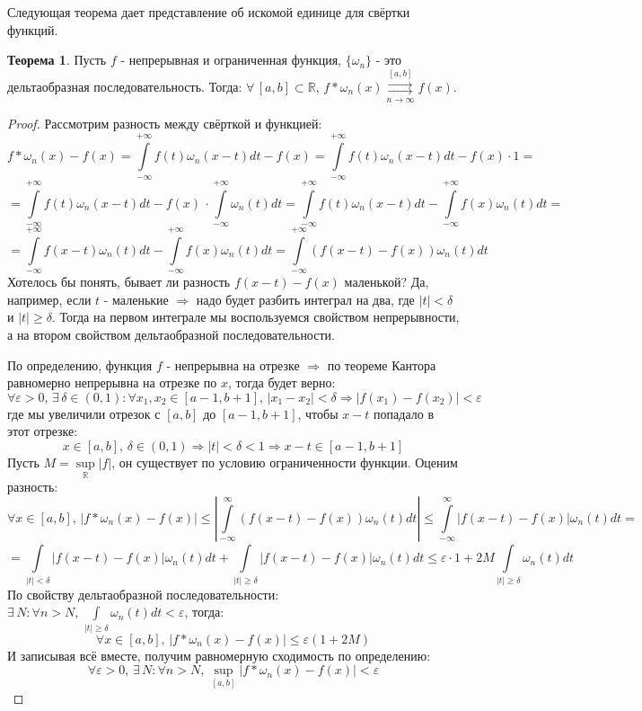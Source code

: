 \documentclass[12pt]{article}
\newcommand{\MR}{\mathbb{R}}
\newcommand{\VE}{\varepsilon}
\theoremstyle{definition}
\newtheorem{theorem}{Теорема}
\newcommand{\ddint}[2]{\displaystyle\int\limits_{#1}^{#2}}
\newcommand{\uconvm}[2]{\overset{#1}{\underset{#2}{\rightrightarrows}}}
\begin{document}
Следующая теорема дает представление об искомой единице для свёртки функций.
\begin{theorem}
	Пусть $f$ - непрерывная и ограниченная функция, $\{\omega_n\}$ - это дельтаобразная последовательность. Тогда: $\forall\, [a,b]\subset \MR, \, f *\omega_n(x) \uconvm{[a,b]}{n \to \infty}f(x)$.
\end{theorem} 
\begin{proof}
	Рассмотрим разность между свёрткой и функцией:
	$$
		f*\omega_n(x) - f(x) = \ddint{-\infty}{+\infty}f(t)\omega_n(x-t)dt - f(x) = \ddint{-\infty}{+\infty}f(t)\omega_n(x-t)dt - f(x){\cdot}1 =
	$$
	$$
		= \ddint{-\infty}{+\infty}f(t)\omega_n(x-t)dt - f(x)\,{\cdot}\!\!\ddint{-\infty}{+\infty}\omega_n(t)dt = \ddint{-\infty}{+\infty}f(t)\omega_n(x-t)dt - \ddint{-\infty}{+\infty}f(x)\omega_n(t)dt = 
	$$
	$$
		= \ddint{-\infty}{+\infty}f(x - t)\omega_n(t)dt - \ddint{-\infty}{+\infty}f(x)\omega_n(t)dt = \ddint{-\infty}{+\infty}\left(f(x-t) - f(x)\right)\omega_n(t)dt
	$$
	Хотелось бы понять, бывает ли разность $f(x-t) - f(x)$ маленькой? Да, например, если $t$ - маленькие $\Rightarrow$ надо будет разбить интеграл на два, где $|t| < \delta$ и $|t| \geq \delta$. Тогда на первом интеграле мы воспользуемся свойством непрерывности, а на втором свойством дельтаобразной последовательности. 
	
	По определению, функция $f$ - непрерывна на отрезке $\Rightarrow$ по теореме Кантора равномерно непрерывна на отрезке по $x$, тогда будет верно:
	$$
		\forall \VE > 0, \, \exists \, \delta \in (0,1) \colon \forall x_1, x_2 \in [a-1,b+1], \, |x_1 - x_2| < \delta \Rightarrow |f(x_1) - f(x_2)| < \VE
	$$
	где мы увеличили отрезок с $[a,b]$ до $[a-1,b+1]$, чтобы $x - t$ попадало в этот отрезке:
	$$
		x \in [a,b], \, \delta \in (0,1) \Rightarrow |t| < \delta < 1 \Rightarrow x -t \in [a-1,b+1]
	$$
	Пусть $M = \sup\limits_{\MR}|f|$, он существует по условию ограниченности функции. Оценим разность:
	$$
		\forall x \in [a,b], \, \left|f*\omega_n(x) - f(x)\right|\leq \left|\ddint{-\infty}{\infty} (f(x-t) - f(x))\omega_n(t)dt \right|\leq \ddint{-\infty}{\infty}\left| f(x-t) - f(x)\right|\omega_n(t)dt = 
	$$
	$$
		= \ddint{|t|< \delta}{}\left| f(x-t) - f(x)\right|\omega_n(t)dt + \ddint{|t|\geq \delta}{}\left| f(x-t) - f(x)\right|\omega_n(t)dt \leq \VE{\cdot}1 + 2M \ddint{|t|\geq \delta}{}\omega_n(t)dt
	$$
	По свойству дельтаобразной последовательности: $\exists \, N \colon \forall n > N, \, \ddint{|t|\geq \delta}{}\omega_n(t)dt < \VE$, тогда:
	$$
		\forall x \in [a,b], \, \left|f*\omega_n(x) - f(x)\right|\leq \VE(1 + 2M)
	$$
	И записывая всё вместе, получим равномерную сходимость по определению:
	$$
		\forall \VE > 0, \, \exists \, N \colon \forall n > N, \, \sup\limits_{[a,b]}\left|f*\omega_n(x) - f(x)\right| < \VE
	$$
\end{proof}
\end{document}

